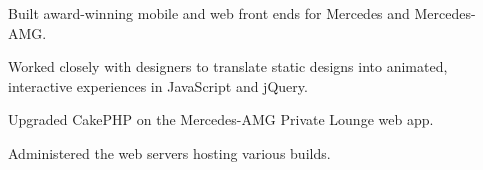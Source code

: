 \documentclass[]{pb-resume}
\begin{document}
\begin{tightemize}
\item Built award-winning mobile and web front ends for Mercedes and Mercedes-AMG.
\item Worked closely with designers to translate static designs into animated, interactive experiences in JavaScript and jQuery.
\item Upgraded CakePHP on the Mercedes-AMG Private Lounge web app.
\item Administered the web servers hosting various builds.
\end{tightemize}
\sectionsep
\end{document}
